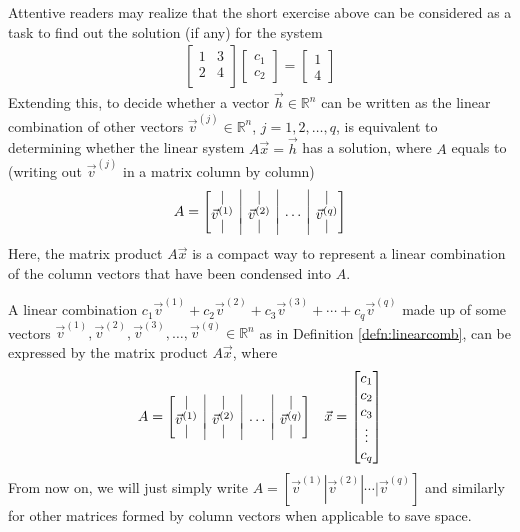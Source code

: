 Attentive readers may realize that the short exercise above can be considered as a task to find out the solution (if any) for the system
\begin{align*}
\begin{bmatrix}
1 & 3 \\
2 & 4 \\
\end{bmatrix}
\begin{bmatrix}
c_1 \\
c_2
\end{bmatrix} =
\begin{bmatrix}
1 \\
4
\end{bmatrix}
\end{align*}
Extending this, to decide whether a vector $\vec{h} \in \mathbb{R}^n$ can be written as the linear combination of other vectors $\vec{v}^{(j)} \in \mathbb{R}^n$, $j = 1, 2, \ldots, q$, is equivalent to determining whether the linear system $A\vec{x} = \vec{h}$ has a solution, where $A$ equals to (writing out $\vec{v}^{(j)}$ in a matrix column by column)
\begin{align*}
A = \left[\begin{array}{@{}c|c|c|c@{}}
| & | & & | \\
\vec{v}^{(1)} & \vec{v}^{(2)} & \cdots & \vec{v}^{(q)} \vspace{-4pt} \\
| & | & & |
\end{array}\right]
\end{align*}
Here, the matrix product $A\vec{x}$ is a compact way to represent a linear combination of the column vectors that have been condensed into $A$.
\begin{proper}
\label{proper:linearcombmatrix}
A linear combination $c_1\vec{v}^{(1)} + c_2\vec{v}^{(2)} + c_3\vec{v}^{(3)} + \cdots + c_q\vec{v}^{(q)}$ made up of some vectors $\vec{v}^{(1)}, \vec{v}^{(2)}, \vec{v}^{(3)}, \ldots, \vec{v}^{(q)} \in \mathbb{R}^n$ as in Definition \ref{defn:linearcomb}, can be expressed by the matrix product $A\vec{x}$, where
\begin{align*}
&A = \left[\begin{array}{@{}c|c|c|c@{}}
| & | & & | \\
\vec{v}^{(1)} & \vec{v}^{(2)} & \cdots & \vec{v}^{(q)} \vspace{-4pt} \\
| & | & & |
\end{array}\right]
&\vec{x} =
\begin{bmatrix}
c_1 \\
c_2 \\
c_3 \\
\vdots \\
c_q
\end{bmatrix}
\end{align*}
From now on, we will just simply write $A = [\vec{v}^{(1)} | \vec{v}^{(2)} | \cdots | \vec{v}^{(q)}]$ and similarly for other matrices formed by column vectors when applicable to save space.
\end{proper}
